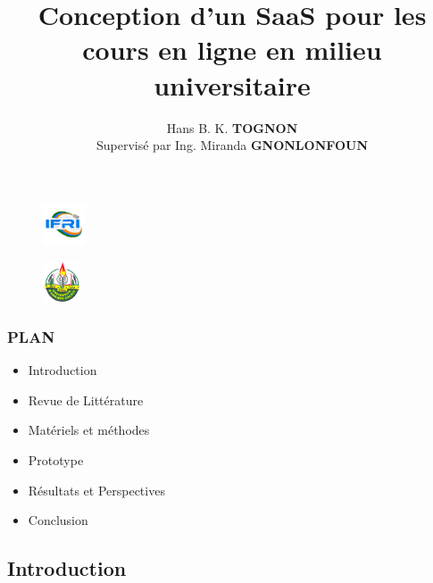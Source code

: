 \documentclass{beamer}
\title{Conception d'un SaaS pour les cours en ligne en milieu universitaire}
\author[Hans TOGNON]{Hans B. K. \textbf{TOGNON} \\ Supervisé par Ing. Miranda \textbf{GNONLONFOUN}}
\institute[IFRI]{
\textbf{I}nstitut de \textbf{F}ormation et de \textbf{R}echerche en  \textbf{I}nformatique \\
\medskip
}
\begin{document}
\begin{frame}
  \thispagestyle{empty}
  \begin{multicols}{2}
    \begin{figure}
        \flushleft
        \includegraphics[width=0.11\textwidth]{logoifri}
    \end{figure}
    \begin{figure}
        \flushright
        \includegraphics[width=0.1\textwidth]{logouac}
    \end{figure}
    \end{multicols}
    \vspace{-1cm}
  \titlepage
  \end{frame}

\begin{frame}
  \frametitle{PLAN}
  \begin{itemize}
    \item Introduction
    \item Revue de Littérature
    \item Matériels et méthodes
    \item Prototype
    \item Résultats et Perspectives
    \item Conclusion
  \end{itemize}
\end{frame}

\begin{frame}
  \begin{center}
    \section{\huge{Introduction}}
  \end{center}
\end{frame}
\end{document}
